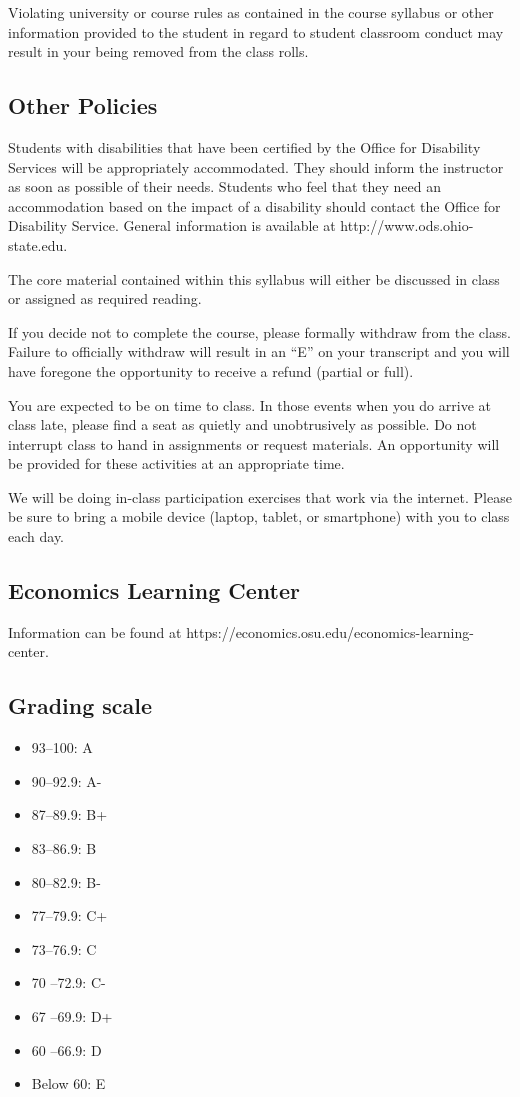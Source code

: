 \documentclass[12pt]{article}
\begin{document}
Violating university or course rules as contained in the course syllabus or other information provided to the student in regard to student classroom conduct may result in your being removed from the class rolls.

\subsection*{Other Policies}

Students with disabilities that have been certified by the Office for Disability Services will be appropriately accommodated.
They should inform the instructor as soon as possible of their needs.
Students who feel that they need an accommodation based on the impact of a disability should contact the Office for Disability Service.
General information is available at http://www.ods.ohio-state.edu.

The core material contained within this syllabus will either be discussed in class or assigned as required reading.

If you decide not to complete the course, please formally withdraw from the class.
Failure to officially withdraw will result in an ``E'' on your transcript and you will have foregone the opportunity to receive a refund (partial or full).

You are expected to be on time to class.
In those events when you do arrive at class late, please find a seat as quietly and unobtrusively as possible.
Do not interrupt class to hand in assignments or request materials.
An opportunity will be provided for these activities at an appropriate time.

We will be doing in-class participation exercises that work via the internet.
Please be sure to bring a mobile device (laptop, tablet, or smartphone) with you to class each day.

\subsection*{Economics Learning Center}

Information can be found at https://economics.osu.edu/economics-learning-center.

\subsection*{Grading scale}
\begin{itemize}
    \item 93–100: A
    \item 90–92.9: A-
    \item 87–89.9: B+
    \item 83–86.9: B
    \item 80–82.9: B-
    \item 77–79.9: C+
    \item 73–76.9: C
    \item 70 –72.9: C-
    \item 67 –69.9: D+
    \item 60 –66.9: D
    \item Below 60: E
\end{itemize}


\end{document}
